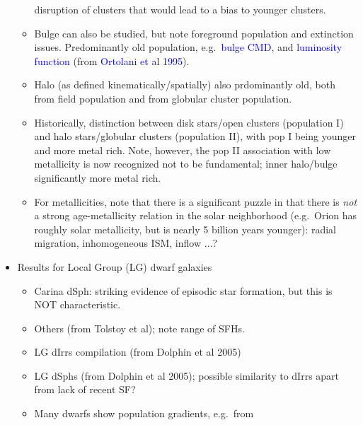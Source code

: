 \documentclass{article}
\begin{document}
\begin{itemize}
\begin{itemize}
                      disruption of clusters that would lead to a bias to
                      younger clusters.
                  \item Bulge can also be studied, but note foreground population
                      and extinction issues. Predominantly old population,
                      e.g.\ \textcolor{blue}{bulge CMD}, and \textcolor{blue}
                      {luminosity function} (from \textcolor{blue}{Ortolani
                      et al 1995}).
                  \item Halo (as defined kinematically/spatially) also
                      prdominantly old, both from field population and from
                      globular cluster population.
                  \item Historically, distinction between disk stars/open
                      clusters (population I) and halo stars/globular clusters
                      (population II), with pop I being younger and more metal
                      rich. Note, however, the pop II association with low
                      metallicity is now recognized not to be fundamental;
                      inner halo/bulge significantly more metal rich.
                  \item For metallicities, note that there is a significant
                      puzzle in that there is \emph{not} a strong age-metallicity
                      relation in the solar neighborhood (e.g.\ Orion has
                      roughly solar metallicity, but is nearly 5 billion years
                      younger): radial migration, inhomogeneous ISM, inflow
                      $\ldots$?
              \end{itemize}
          \item Results for Local Group (LG) dwarf galaxies
              \begin{itemize}
                  \item Carina dSph: striking evidence of episodic star
                      formation, but this is NOT characteristic.
                  \item Others (from Tolstoy et al); note range of SFHs.
                  \item LG dIrrs compilation (from Dolphin et al 2005)
                  \item LG dSphs (from Dolphin et al 2005); possible similarity
                      to dIrrs apart from lack of recent SF?
                  \item Many dwarfs show population gradients, e.g.\ from

\end{itemize}
\end{itemize}
\end{document}
